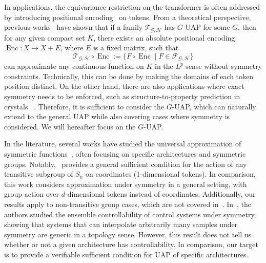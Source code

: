 \documentclass{article}
\newcommand{\lt}[1]{{\footnotesize\textcolor{cyan!60!black}{\tt TL: #1}}}
\newcommand{\ql}[1]{{\footnotesize\textcolor{red}{QL: #1}}}
\begin{document}
In applications, the equivariance restriction on the transformer is often addressed by introducing positional encoding~\cite{vaswani2017attention} on tokens. From a theoretical perspective, previous works~\cite{yun2019transformers,yun2020n,kajitsukatransformers,jiang2024approximation} have shown that if a family $\mathcal T_{\mathcal G,\mathcal H}$ has $G$-UAP for some $G$, then for any given compact set $K$, there exists an absolute positional encoding $\operatorname{Enc}:X\to X+E$, where $E$ is a fixed matrix, such that
\begin{equation}
    \mathcal T_{\mathcal G,\mathcal H}\circ \operatorname{Enc}:= \{ F\circ \operatorname{Enc}\mid F\in\mathcal F_{\mathcal G,\mathcal H} \}
\end{equation}
can approximate any continuous function on $K$ in the $L^p$ sense without symmetry constraints. Technically, this can be done by making the domains of each token position distinct. On the other hand, there are also applications where exact symmetry needs to be enforced, such as structure-to-property prediction in crystals
~\cite{xie2018crystal,chen2019graph,ren2020inverse,jiao2023crystal}.
Therefore, it is sufficient to consider the $G$-UAP, which can naturally extend to the general UAP while also covering cases where symmetry is considered. We will hereafter focus on the $G$-UAP.






In the literature, several works have studied the universal approximation of symmetric functions~\cite{cohen2016group,finzi2020generalizing,yarotsky2022universal,li2024deep}, often focusing on specific architectures and symmetric groups. Notably,~\cite{li2024deep} provides a general sufficient condition for the action of any transitive subgroup of $S_n$ on coordinates (1-dimensional tokens). In comparison, this work considers approximation under symmetry in a general setting, with group action over $d$-dimensional tokens instead of coordinates. Additionally, our results apply to non-transitive group cases, which are not covered in~\cite{li2024deep}. {In~\cite{agrachev2025generic}, the authors studied the ensemble controllability of control systems under symmetry, showing that systems that can interpolate arbitrarily many samples under symmetry are generic in a topology sense. However, this result does not tell us whether or not a given architecture has controllability. In comparison, our target is to provide a verifiable sufficient condition for UAP of specific architectures.}
\end{document}
